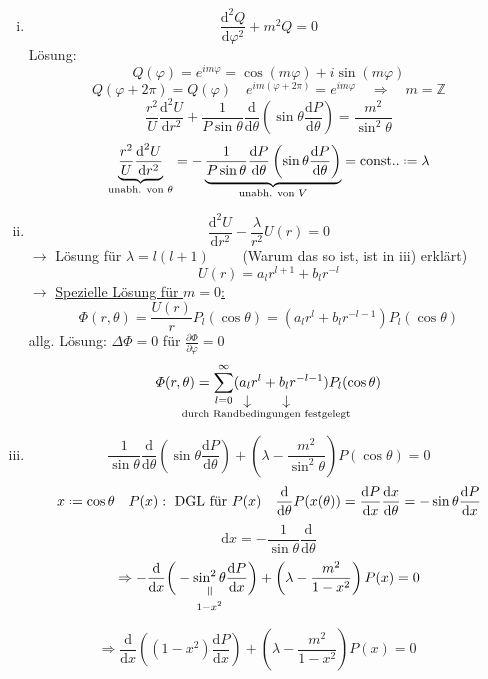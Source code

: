 \documentclass[titlepage,11pt,a4paper,ngerman]{report}
\newcommand*{\defeq}{\mathrel{\vcenter{\baselineskip0.5ex \lineskiplimit0pt \hbox{\scriptsize.}\hbox{\scriptsize.}}}=}
\newcommand{\tx}[1]{\textrm{#1}}
\newcommand{\const}{\tx{const.}}
\newcommand{\ub}[1]{\underbrace{#1}}
\newcommand{\dd}{\tx{d}}
\newcommand{\verteq}{\rotatebox{90}{$\,=$}}
\newcommand{\equalto}[2]{\underset{\scriptstyle\overset{\mkern4mu\verteq}{#2}}{#1}}
\newcommand{\custo}[3]{\underset{\scriptstyle\overset{\mkern4mu\rotatebox{-90}{$\,#1$}}{#3}}{#2}}
\newcommand{\prt}[2]{\frac{\partial #1}{\partial #2}}
\newcommand{\prd}[2]{\frac{\tx{d} #1}{\tx{d} #2}}
\renewcommand{\Phi}{\varPhi}
\newcommand{\summ}[2]{\sum_{#1}^{#2}}
\newcommand{\frbox}[2]{\begin{tcolorbox}[colback=white,colframe=red!75!black,fonttitle=\bfseries,title=#1]#2\end{tcolorbox}}
\begin{document}
\begin{enumerate}[i)]
	\item $$\frac{\textrm{d}^2 Q}{\textrm{d} \varphi^2} + m^2 Q = 0$$ Lösung: $$Q(\varphi) = e^{im\varphi} = \cos(m\varphi) + i\sin(m\varphi)$$
	 	$$Q(\varphi + 2 \pi) = Q(\varphi) \quad e^{im(\varphi + 2\pi)} = e^{im\varphi} \quad \Rightarrow \quad m = \mathbb Z$$
	 	$$\frac{r^2}{U} \frac{\textrm{d}^2 U}{\textrm{d} r^2} + \frac{1}{P\sin\theta} \frac{\textrm{d}}{\textrm{d} \theta}\left( \sin\theta \frac{\textrm{d}P}{\textrm{d}\theta} \right) = \frac{m^2}{\sin^2\theta}$$
	 	$$\ub{\frac{r^2}{U} \frac{\textrm{d}^2 U}{\textrm{d} r^2}}_{\tx{unabh. von } \theta } = - \ub{\frac{1}{P\sin\theta}\frac{\textrm{d} P}{\textrm{d} \theta}\left( \sin\theta \frac{\textrm{d}P}{\textrm{d}\theta} \right)}_{\tx{unabh. von } V} = \const. \defeq \lambda$$
	 \item $$\frac{\textrm{d}^2 U}{\textrm{d} r^2} - \frac{\lambda}{r^2} U(r) = 0$$
	 	$\rightarrow$ Lösung für $\lambda = l(l + 1) \qquad$ (Warum das so ist, ist  in iii) erklärt)
	 	$$U(r) = a_l r^{l + 1} + b_l r^{-l}$$
	 	$\rightarrow$ \underline{Spezielle Lösung für $m = 0$:}
	 	$$\Phi(r,\theta) = \frac{U(r)}{r}P_l (\cos\theta) = (a_l r^l + b_l r^{-l - 1}) P_l (\cos\theta)$$
	 	allg. Lösung: $\Delta\Phi = 0$ für $\prt{\Phi}{\varphi} = 0$
	 	$$\Phi(r,\theta) = \summ{l = 0}{\infty} (\custo{\to}{a_l}{\mathclap{\hspace{30pt}\textrm{durch Randbedingungen festgelegt}}} r^l + \custo{\to}{b_l}{} r^{-l - 1}) P_l(\cos\theta)$$
	 \item $$\frac{1}{\sin\theta} \frac{\textrm{d}}{\textrm{d} \theta}\left( \sin\theta \frac{\textrm{d}P}{\textrm{d}\theta}\right) + \left(\lambda - \frac{m^2}{\sin^2\theta}\right)P(\cos\theta) = 0$$
	 	$$x \defeq \cos\theta \quad P(x): \textrm{ DGL für } P(x) \quad \frac{\textrm{d}}{\textrm{d} \theta} P(x(\theta)) = \frac{\textrm{d}P}{\textrm{d}x} \frac{\textrm{d}x}{\textrm{d}\theta} = -\sin \theta \frac{\textrm{d}P}{\textrm{d}x}$$
	 	\begin{equation*}
	 	\dd x = - \frac{1}{\sin\theta} \prd{}{\theta}
	 	\end{equation*}
	 	$$\Rightarrow - \frac{\textrm{d}}{\textrm{d}x} \bigg( - \equalto{\sin^2\theta}{1 - x^2} \frac{\textrm{d}P}{\textrm{d}x} \bigg) + \left(\lambda - \frac{m^2}{1-x^2}\right) P(x) = 0$$
\end{enumerate}
\frbox{Zugeordnete Legendresche DGL}{$$\Rightarrow \frac{\textrm{d}}{\textrm{d}x} \left( (1-x^2) \frac{\textrm{d}P}{\textrm{d}x} \right) + \left( \lambda - \frac{m^2}{1 - x^2} \right) P(x) = 0$$} 
\end{document}
